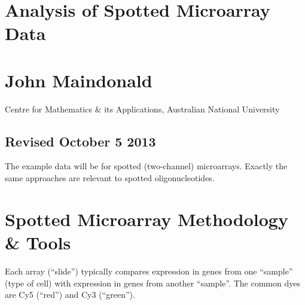 \documentclass[a4paper,9pt]{article}\usepackage[]{graphicx}\usepackage[]{color}
\begin{document}
\begin{center}
\section*{\LARGE \bf Analysis of Spotted  Microarray Data}

\section*{John Maindonald}
Centre for Mathematics \& its Applications, Australian National University

\subsection*{Revised October 5 2013}
\end{center}
\vspace*{0.5cm}

The example data will be for spotted (two-channel) microarrays.  Exactly
the same approaches are relevant to spotted oligonucleotides.

\section{Spotted Microarray Methodology \& Tools}
Each array (``slide'') typically compares expression in genes from one
``sample'' (type of cell) with expression in genes from another
``sample''. The common dyes are Cy5 (``red'') and Cy3 (``green'').
\end{document}
